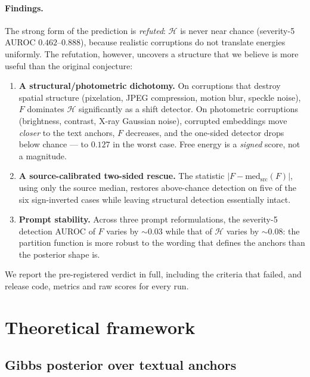 \documentclass[11pt]{article}
\newcommand{\Hent}{\mathcal{H}}
\begin{document}
\paragraph{Findings.} The strong form of the prediction is \emph{refuted}:
$\Hent$ is never near chance (severity-5 AUROC $0.462$--$0.888$), because
realistic corruptions do not translate energies uniformly. The refutation,
however, uncovers a structure that we believe is more useful than the original
conjecture:

\begin{enumerate}
\item \textbf{A structural/photometric dichotomy.} On corruptions that destroy
spatial structure (pixelation, JPEG compression, motion blur, speckle noise),
$F$ dominates $\Hent$ significantly as a shift detector. On photometric
corruptions (brightness, contrast, X-ray Gaussian noise), corrupted embeddings
move \emph{closer} to the text anchors, $F$ decreases, and the one-sided
detector drops below chance --- to $0.127$ in the worst case. Free energy is a
\emph{signed} score, not a magnitude.
\item \textbf{A source-calibrated two-sided rescue.} The statistic
$|F - \mathrm{med}_{\mathrm{src}}(F)|$, using only the source median, restores
above-chance detection on five of the six sign-inverted cases while leaving
structural detection essentially intact.
\item \textbf{Prompt stability.} Across three prompt reformulations, the
severity-5 detection AUROC of $F$ varies by $\sim$$0.03$ while that of
$\Hent$ varies by $\sim$$0.08$: the partition function is more robust to the
wording that defines the anchors than the posterior shape is.
\end{enumerate}

We report the pre-registered verdict in full, including the criteria that
failed, and release code, metrics and raw scores for every run.

\section{Theoretical framework}
\label{sec:theory}

\subsection{Gibbs posterior over textual anchors}
\end{document}
